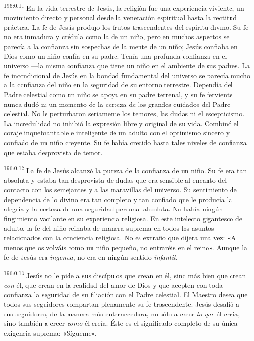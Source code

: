 \par 
\textsuperscript{196:0.11} En la vida terrestre de Jesús, la religión fue una experiencia viviente, un movimiento directo y personal desde la veneración espiritual hasta la rectitud práctica. La fe de Jesús produjo los frutos trascendentes del espíritu divino. Su fe no era inmadura y crédula como la de un niño, pero en muchos aspectos se parecía a la confianza sin sospechas de la mente de un niño; Jesús confiaba en Dios como un niño confía en su padre. Tenía una profunda confianza en el universo ---la misma confianza que tiene un niño en el ambiente de sus padres. La fe incondicional de Jesús en la bondad fundamental del universo se parecía mucho a la confianza del niño en la seguridad de su entorno terrestre. Dependía del Padre celestial como un niño se apoya en su padre terrenal, y su fe ferviente nunca dudó ni un momento de la certeza de los grandes cuidados del Padre celestial. No le perturbaron seriamente los temores, las dudas ni el escepticismo. La incredulidad no inhibió la expresión libre y original de su vida. Combinó el coraje inquebrantable e inteligente de un adulto con el optimismo sincero y confiado de un niño creyente. Su fe había crecido hasta tales niveles de confianza que estaba desprovista de temor.

\par 
\textsuperscript{196:0.12} La fe de Jesús alcanzó la pureza de la confianza de un niño. Su fe era tan absoluta y estaba tan desprovista de dudas que era sensible al encanto del contacto con los semejantes y a las maravillas del universo. Su sentimiento de dependencia de lo divino era tan completo y tan confiado que le producía la alegría y la certeza de una seguridad personal absoluta. No había ningún fingimiento vacilante en su experiencia religiosa. En este intelecto gigantesco de adulto, la fe del niño reinaba de manera suprema en todos los asuntos relacionados con la conciencia religiosa. No es extraño que dijera una vez: «A menos que os volváis como un niño pequeño, no entraréis en el reino». Aunque la fe de Jesús era \textit{ingenua}, no era en ningún sentido \textit{infantil}.

\par 
\textsuperscript{196:0.13} Jesús no le pide a sus discípulos que crean en él, sino más bien que crean \textit{con} él, que crean en la realidad del amor de Dios y que acepten con toda confianza la seguridad de su filiación con el Padre celestial. El Maestro desea que todos sus seguidores compartan plenamente su fe trascendente. Jesús desafió a sus seguidores, de la manera más enternecedora, no sólo a creer \textit{lo que} él creía, sino también a creer \textit{como} él creía. Éste es el significado completo de su única exigencia suprema: «Sígueme».

